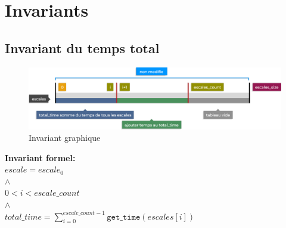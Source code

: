 \section{Invariants}\label{invariants}

\subsection{Invariant du temps total}

\begin{figure}[h]
    \centering
    \includegraphics[width=1\textwidth]{invariant_time.pdf}
    \caption{Invariant graphique}
\end{figure}

\textbf{Invariant formel:} \\
    $escale = escale_0$ \\
    $\land$ \\
    $0 < i < escale\_count$ \\
    $\land$ \\
    $total\_time = \sum_{i=0}^{escale\_count-1} \texttt{get\_time}(escales[i])$
